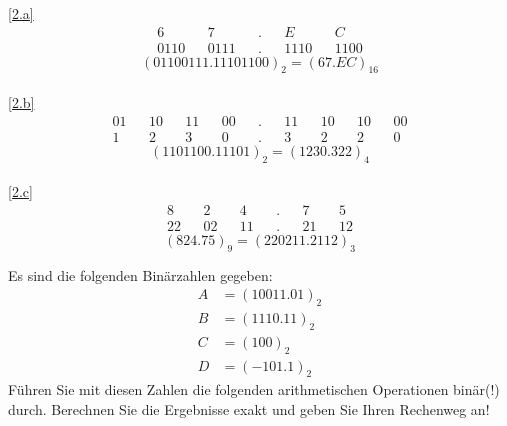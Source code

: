 \documentclass[a4paper, margins=3cm, newpage]{homework}
\begin{document}
\begin{solution}
\ref{2.a}
\begin{align*}
	&6& &7& &.& &E& &C& \\
	&0110& &0111& &.& &1110& &1100&
\end{align*}
\[(01100111.11101100)_2 = (67.EC)_{16}\] \\

\ref{2.b}
\begin{align*}
	&01& &10& &11& &00& &.& &11& &10& &10& &00& \\
	&1& &2& &3& &0& &.& &3& &2& &2& &0&
\end{align*}
\[(1101100.11101)_2 = (1230.322)_{4}\] \\

\ref{2.c}
\begin{align*}
	&8& &2& &4& &.& &7& &5& \\
	&22& &02& &11& &.& &21& &12&
\end{align*}
\[(824.75)_9 = (220211.2112)_3\]

\end{solution}

\begin{problem}
Es sind die folgenden Binärzahlen gegeben:
\begin{align*}
	A &= (10011.01)_2 \\
	B &= (1110.11)_2 \\
	C &= (100)_2 \\
	D &= (-101.1)_2
\end{align*}
Führen Sie mit diesen Zahlen die folgenden arithmetischen Operationen binär(!) durch. Berechnen Sie die Ergebnisse exakt und geben Sie Ihren Rechenweg an!
\end{problem}
\end{document}
